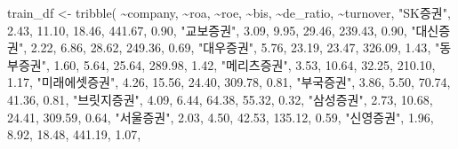 \documentclass[
]{book}
\newenvironment{Shaded}{\begin{snugshade}}{\end{snugshade}}
\newcommand{\FloatTok}[1]{\textcolor[rgb]{0.00,0.00,0.81}{#1}}
\newcommand{\FunctionTok}[1]{\textcolor[rgb]{0.00,0.00,0.00}{#1}}
\newcommand{\NormalTok}[1]{#1}
\newcommand{\OtherTok}[1]{\textcolor[rgb]{0.56,0.35,0.01}{#1}}
\newcommand{\SpecialCharTok}[1]{\textcolor[rgb]{0.00,0.00,0.00}{#1}}
\newcommand{\StringTok}[1]{\textcolor[rgb]{0.31,0.60,0.02}{#1}}
\begin{document}
\begin{Shaded}
\begin{Highlighting}[]
\NormalTok{train\_df }\OtherTok{\textless{}{-}} \FunctionTok{tribble}\NormalTok{(}
  \SpecialCharTok{\textasciitilde{}}\NormalTok{company, }\SpecialCharTok{\textasciitilde{}}\NormalTok{roa, }\SpecialCharTok{\textasciitilde{}}\NormalTok{roe, }\SpecialCharTok{\textasciitilde{}}\NormalTok{bis, }\SpecialCharTok{\textasciitilde{}}\NormalTok{de\_ratio, }\SpecialCharTok{\textasciitilde{}}\NormalTok{turnover,}
  \StringTok{"SK증권"}\NormalTok{, }\FloatTok{2.43}\NormalTok{, }\FloatTok{11.10}\NormalTok{, }\FloatTok{18.46}\NormalTok{, }\FloatTok{441.67}\NormalTok{, }\FloatTok{0.90}\NormalTok{,}
  \StringTok{"교보증권"}\NormalTok{, }\FloatTok{3.09}\NormalTok{, }\FloatTok{9.95}\NormalTok{, }\FloatTok{29.46}\NormalTok{, }\FloatTok{239.43}\NormalTok{, }\FloatTok{0.90}\NormalTok{,}
  \StringTok{"대신증권"}\NormalTok{, }\FloatTok{2.22}\NormalTok{, }\FloatTok{6.86}\NormalTok{, }\FloatTok{28.62}\NormalTok{, }\FloatTok{249.36}\NormalTok{, }\FloatTok{0.69}\NormalTok{,}
  \StringTok{"대우증권"}\NormalTok{, }\FloatTok{5.76}\NormalTok{, }\FloatTok{23.19}\NormalTok{, }\FloatTok{23.47}\NormalTok{, }\FloatTok{326.09}\NormalTok{, }\FloatTok{1.43}\NormalTok{,}
  \StringTok{"동부증권"}\NormalTok{, }\FloatTok{1.60}\NormalTok{, }\FloatTok{5.64}\NormalTok{, }\FloatTok{25.64}\NormalTok{, }\FloatTok{289.98}\NormalTok{, }\FloatTok{1.42}\NormalTok{,}
  \StringTok{"메리츠증권"}\NormalTok{, }\FloatTok{3.53}\NormalTok{, }\FloatTok{10.64}\NormalTok{, }\FloatTok{32.25}\NormalTok{, }\FloatTok{210.10}\NormalTok{, }\FloatTok{1.17}\NormalTok{,}
  \StringTok{"미래에셋증권"}\NormalTok{, }\FloatTok{4.26}\NormalTok{, }\FloatTok{15.56}\NormalTok{, }\FloatTok{24.40}\NormalTok{, }\FloatTok{309.78}\NormalTok{, }\FloatTok{0.81}\NormalTok{,}
  \StringTok{"부국증권"}\NormalTok{, }\FloatTok{3.86}\NormalTok{, }\FloatTok{5.50}\NormalTok{, }\FloatTok{70.74}\NormalTok{, }\FloatTok{41.36}\NormalTok{, }\FloatTok{0.81}\NormalTok{,}
  \StringTok{"브릿지증권"}\NormalTok{, }\FloatTok{4.09}\NormalTok{, }\FloatTok{6.44}\NormalTok{, }\FloatTok{64.38}\NormalTok{, }\FloatTok{55.32}\NormalTok{, }\FloatTok{0.32}\NormalTok{,}
  \StringTok{"삼성증권"}\NormalTok{, }\FloatTok{2.73}\NormalTok{, }\FloatTok{10.68}\NormalTok{, }\FloatTok{24.41}\NormalTok{, }\FloatTok{309.59}\NormalTok{, }\FloatTok{0.64}\NormalTok{,}
  \StringTok{"서울증권"}\NormalTok{, }\FloatTok{2.03}\NormalTok{, }\FloatTok{4.50}\NormalTok{, }\FloatTok{42.53}\NormalTok{, }\FloatTok{135.12}\NormalTok{, }\FloatTok{0.59}\NormalTok{,}
  \StringTok{"신영증권"}\NormalTok{, }\FloatTok{1.96}\NormalTok{, }\FloatTok{8.92}\NormalTok{, }\FloatTok{18.48}\NormalTok{, }\FloatTok{441.19}\NormalTok{, }\FloatTok{1.07}\NormalTok{,}

\end{Highlighting}
\end{Shaded}
\end{document}
